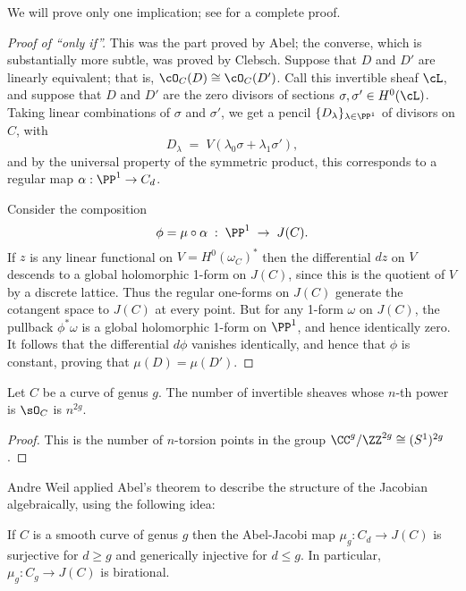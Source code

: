 We will prove only one implication; see \cite[Section 2.2]{Griffiths-Harris1978}  for a complete proof.

\begin{proof}[Proof of ``only if'']
This was the part proved by Abel; the converse, which is substantially more subtle, was proved by Clebsch. Suppose that $D$ and $D'$ are linearly equivalent; that is, $\cO_C(D) \cong \cO_C(D')$. Call this invertible sheaf $\cL$, and suppose that $D$ and $D'$ are the zero divisors of sections $\sigma, \sigma' \in H^0(\cL)$.
Taking linear combinations of $\sigma$ and $\sigma'$, we get a pencil $\{D_\lambda\}_{\lambda \in \PP^1}$ of divisors on $C$, with
$$
D_\lambda \; = \; V(\lambda_0\sigma + \lambda_1\sigma'),
$$
and by the universal property of the symmetric product, this corresponds to a regular map $\alpha : \PP^1 \to C_d$. 

Consider the composition
$$
\phi = \mu \circ \alpha \; : \; \PP^1 \; \to \; J(C).
$$
 If $z$ is any linear functional on $V = H^0(\omega_C)^*$ then the differential $dz$  on $V$ descends to a global holomorphic 1-form on
 $J(C)$, since this is the quotient of $V$ by a discrete lattice. Thus the regular one-forms on $J(C)$ generate the cotangent space to $J(C)$ at every point. But for any 1-form $\omega$ on $J(C)$, the pullback $\phi^*\omega$ is a global holomorphic 1-form on $\PP^1$, and hence identically zero. It follows that the differential $d\phi$ vanishes identically, and hence that $\phi$ is constant, proving that $\mu(D) = \mu(D')$.
\end{proof}

\begin{corollary}
Let $C$ be a curve of genus $g$. The number of invertible sheaves whose $n$-th power is $\sO_C$ is $n^{2g}$.
\end{corollary}
\begin{proof}
 This is the number of $n$-torsion points in the group $\CC^g/\ZZ^{2g} \cong (S^1)^{2g}$.
\end{proof}

Andre Weil applied Abel's theorem to describe the structure of the Jacobian algebraically, using the following idea:

\begin{corollary}
If $C$ is a smooth curve of genus $g$ then the Abel-Jacobi map $\mu_g: C_d \to J(C)$ is  surjective for $d\geq g$ and generically injective for $d\leq g$. In particular, $\mu_g:C_g \to J(C)$ is birational. \end{corollary}

